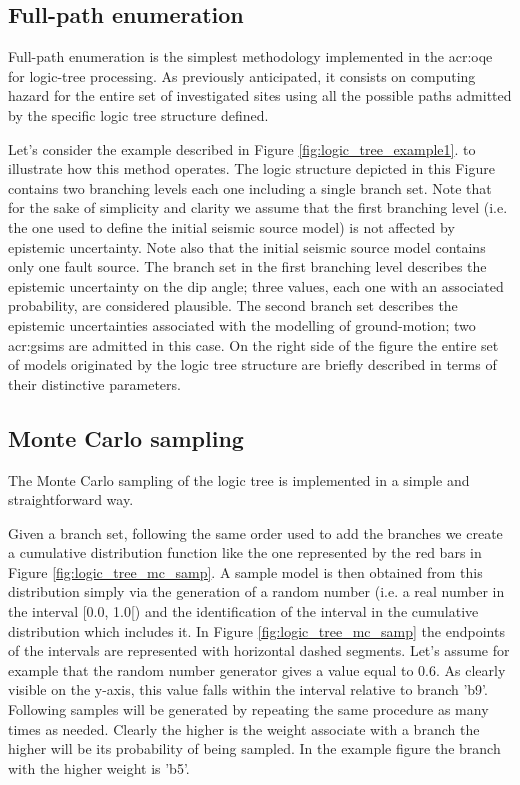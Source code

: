 \subsection{Full-path enumeration}
Full-path enumeration is the simplest methodology implemented in the
\gls{acr:oqe} for logic-tree processing. 
%
As previously anticipated, it consists on computing hazard 
for the entire set of investigated sites using all the possible paths 
admitted by the specific logic tree structure defined.

Let's consider the example described in Figure \ref{fig:logic_tree_example1}.
to illustrate how this method operates.
%
The logic structure depicted in this Figure contains two branching 
levels each one including a single branch set. 
%
Note that for the sake of simplicity and clarity we assume that the first 
branching level (i.e. the one used to define the initial seismic source 
model) is not affected by epistemic uncertainty. 
%
Note also that the initial seismic source model contains only one fault 
source.
%
The branch set in the first branching level describes the epistemic 
uncertainty on the dip angle; three values, each one with an associated 
probability, are considered plausible. 
%
The second branch set describes the epistemic uncertainties associated with 
the modelling of ground-motion; two \glspl{acr:gsim} are admitted in this
case. 
%
On the right side of the figure the entire set of models originated by the 
logic tree structure are briefly described in terms of their 
distinctive parameters.
\subsection{Monte Carlo sampling}
The Monte Carlo sampling of the logic tree is implemented in a simple and 
straightforward way. 

Given a branch set, following the same order used to add the branches 
we create a cumulative distribution function like the one represented 
by the red bars in Figure \ref{fig:logic_tree_mc_samp}. 
%
A sample model is then obtained from this distribution simply via the 
generation of a random number (i.e. a real number in the interval 
[0.0, 1.0[) and the identification of the interval in the cumulative 
distribution which includes it. In Figure \ref{fig:logic_tree_mc_samp}
the endpoints of the intervals are represented with horizontal dashed
segments. Let's assume for example that the random number generator
gives a value equal to 0.6. As clearly visible on the y-axis,
this value falls within the interval relative to branch 'b9'. 
%
Following samples will be generated by repeating the same procedure as
many times as needed. Clearly the higher is the weight associate with 
a branch the higher will be its probability of being sampled. In the 
example figure the branch with the higher weight is 'b5'.

